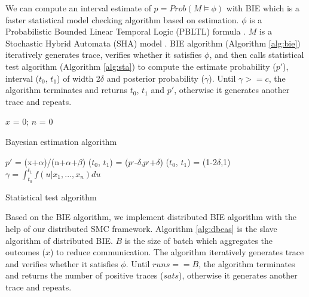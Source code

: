 We can compute an interval estimate of $p=Prob(M\models\phi)$ with BIE which is a faster statistical model checking algorithm based on estimation. $\phi$ is a Probabilistic Bounded Linear Temporal Logic (PBLTL) formula \cite{baier2008principles}. $M$ is a Stochastic Hybrid Automata (SHA) model \cite{David2014Statistical}. BIE algorithm (Algorithm \ref{alg:bie}) iteratively generates trace, verifies whether it satisfies $\phi$, and then calls statistical test algorithm (Algorithm \ref{alg:sta}) to compute the estimate probability ($p'$), interval ($t_0$, $t_1$) of width 2$\delta$ and posterior probability ($\gamma$). Until $\gamma >= c$, the algorithm terminates and returns $t_0$, $t_1$ and $p'$, otherwise it generates another trace and repeats.

\begin{algorithm}[t]
{}
$x$ = 0; $n$ = 0\;
\caption{Bayesian estimation algorithm}
\label{alg:bie}
\end{algorithm}


\begin{algorithm}[t]
{}
        $p'$ = (x+$\alpha$)/(n+$\alpha$+$\beta$)\;
        ($t_0$, $t_1$) = ($p^,$-$\delta$,$p^,$+$\delta$)\;
        {
           ($t_0$, $t_1$) = (1-2$\delta$,1)\;
         }{
          }
        $\gamma=\int_{t_0}^{t_1} {f(u|x_1,...,x_n)du}$\;
\caption{Statistical test algorithm}
\label{alg:sta}
\end{algorithm}

Based on the BIE algorithm, we implement distributed BIE algorithm with the help of our distributed SMC framework. Algorithm \ref{alg:dbeas} is the slave algorithm of distributed BIE. $B$ is the size of batch which aggregates the outcomes ($x$) to reduce communication. The algorithm iteratively generates trace and verifies whether it satisfies $\phi$. Until $runs == B$, the algorithm terminates and returns the number of positive traces ($sats$), otherwise it generates another trace and repeats.

